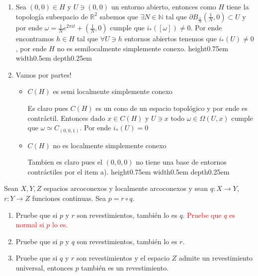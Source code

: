 \documentclass[11pt]{article}
\newcommand{\R}{{\mathbb{R}}}
\newcommand{\N}{{\mathbb{N}}}
\newenvironment{proof}[1][Demostraci\'on]{\begin{trivlist}
\item[\hskip \labelsep {\bfseries #1}]}{\end{trivlist}}
\newcommand{\qed}{\nobreak \ifvmode \relax \else
      \ifdim\lastskip<1.5em \hskip-\lastskip
      \hskip1.5em plus0em minus0.5em \fi \nobreak
      \vrule height0.75em width0.5em depth0.25em\fi}
\begin{document}
\begin{enumerate}
\begin{proof}

\begin{enumerate}

\item Sea $(0,0) \in H$ y $U \ni (0,0)$ un entorno abierto, entonces como $H$ tiene la topolog\'ia subespacio de $\R^2$ sabemos que $\exists N \in \N$ tal que $\partial B_{\frac{1}{N}} (\frac{1}{N},0) \subset U$ y por ende $\omega = \frac{1}{N} e^{2 \pi i t} + (\frac{1}{N},0)$ cumple que $i_*([\omega]) \neq 0$. Por ende encontramos $h \in H$ tal que $\forall U \ni h$ entornos abiertos tenemos que $i_*(U) \neq 0$, por ende $H$ no es semilocalmente simplemente conexo. \qed

\item Vamos por partes!

\begin{itemize}

\item {$C(H)$ es semi localmente simplemente conexo}

Es claro pues $C(H)$ es un cono de un espacio topol\'ogico y por ende es contr\'actil. Entonces dado $x \in C(H)$ y $U \ni x$ todo $\omega \in \Omega(U,x)$ cumple que $\omega \simeq C_{(0,0,1)}$. Por ende $i_*(U)=0$

\item {$C(H)$ no es localmente simplemente conexo}

Tambien es claro pues el $(0,0,0)$ no tiene una base de entornos contr\'actiles por el item a). \qed

\end{itemize}

\end{enumerate}

\end{proof}

\item
Sean $X, Y, Z$ espacios arcoconexos y localmente arcoconexos y sean $q:X\to Y$, $r:Y\to Z$ funciones continuas. Sea $p=r\circ q$.
\begin{enumerate}
\item {Pruebe que si $p$ y $r$ son revestimientos, tambi\'en lo es $q$. \textcolor{red}{Pruebe que $q$ es normal si $p$ lo es.}}
\item {Pruebe que si $p$ y $q$ son revestimientos, tambi\'en lo es $r$. }
\item {Pruebe que si $q$ y $r$ son revestimientos y el espacio $Z$ admite un revestimiento universal, entonces $p$ tambi\'en es un revestimiento.}
\end{enumerate}



\end{enumerate}
\end{document}
